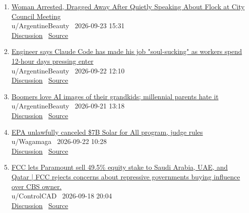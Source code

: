 \documentclass[11pt,a4paper]{article}
\begin{document}
\begin{enumerate}
  \item \href{https://www.reddit.com/r/technology/comments/1wo98cp/woman_arrested_dragged_away_after_quietly/}{Woman Arrested, Dragged Away After Quietly Speaking About Flock at City Council Meeting}\\ {\small u/ArgentineBeauty \textbullet\ 2026-09-23 15:31}\\ {\small \href{https://www.reddit.com/r/technology/comments/1wo98cp/woman_arrested_dragged_away_after_quietly/}{Discussion} \textbullet\ \href{https://www.404media.co/woman-arrested-after-city-council-denies-residents-right-to-speak-on-flock-cameras/}{Source}}
  \item \href{https://www.reddit.com/r/technology/comments/1wn7qdj/engineer_says_claude_code_has_made_his_job/}{Engineer says Claude Code has made his job "soul-sucking" as workers spend 12-hour days pressing enter}\\ {\small u/ArgentineBeauty \textbullet\ 2026-09-22 12:10}\\ {\small \href{https://www.reddit.com/r/technology/comments/1wn7qdj/engineer_says_claude_code_has_made_his_job/}{Discussion} \textbullet\ \href{https://www.techspot.com/news/113937-engineer-claude-code-has-made-job-soul-sucking.html}{Source}}
  \item \href{https://www.reddit.com/r/technology/comments/1wmcl22/boomers_love_ai_images_of_their_grandkids/}{Boomers love AI images of their grandkids; millennial parents hate it}\\ {\small u/ArgentineBeauty \textbullet\ 2026-09-21 13:18}\\ {\small \href{https://www.reddit.com/r/technology/comments/1wmcl22/boomers_love_ai_images_of_their_grandkids/}{Discussion} \textbullet\ \href{https://www.businessinsider.com/grandparents-ai-images-grandkids-privacy-parents-2026-9}{Source}}
  \item \href{https://www.reddit.com/r/technology/comments/1wn5qva/epa_unlawfully_canceled_7b_solar_for_all_program/}{EPA unlawfully canceled \$7B Solar for All program, judge rules}\\ {\small u/Wagamaga \textbullet\ 2026-09-22 10:28}\\ {\small \href{https://www.reddit.com/r/technology/comments/1wn5qva/epa_unlawfully_canceled_7b_solar_for_all_program/}{Discussion} \textbullet\ \href{https://www.smartcitiesdive.com/news/epa-unlawfully-canceled-7b-solar-for-all-program-judge-rules/830904/}{Source}}
  \item \href{https://www.reddit.com/r/technology/comments/1wk0uuy/fcc_lets_paramount_sell_495_equity_stake_to_saudi/}{FCC lets Paramount sell 49.5\% equity stake to Saudi Arabia, UAE, and Qatar | FCC rejects concerns about repressive governments buying influence over CBS owner.}\\ {\small u/ControlCAD \textbullet\ 2026-09-18 20:04}\\ {\small \href{https://www.reddit.com/r/technology/comments/1wk0uuy/fcc_lets_paramount_sell_495_equity_stake_to_saudi/}{Discussion} \textbullet\ \href{https://arstechnica.com/tech-policy/2026/09/fcc-lets-paramount-sell-49-5-equity-stake-to-saudi-arabia-uae-and-qatar/}{Source}}

\end{enumerate}
\end{document}
